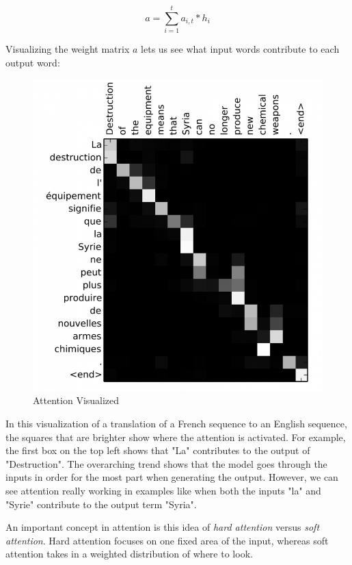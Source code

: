 \documentclass{article}
\begin{document}
\begin{equation}
a = \sum_{i=1}^{t}a_{i,t}*h_{i}
\end{equation}

Visualizing the weight matrix $a$ lets us see what input words contribute to each output word:


\begin{figure}[H]
\centering
\includegraphics[scale=.3]{attention_example.png}
\caption{Attention Visualized}
\label{fig:attention_example}
\end{figure}

In this visualization of a translation of a French sequence to an English sequence, the squares that are brighter show where the attention is activated. For example, the first box on the top left shows that "La" contributes to the output of "Destruction". The overarching trend shows that the model goes through the inputs in order for the most part when generating the output. However, we can see attention really working in examples like when both the inputs "la" and "Syrie" contribute to the output term "Syria".

An important concept in attention is this idea of \textit{hard attention} versus \textit{soft attention}. Hard attention focuses on one fixed area of the input, whereas soft attention takes in a weighted distribution of where to look.
\end{document}
